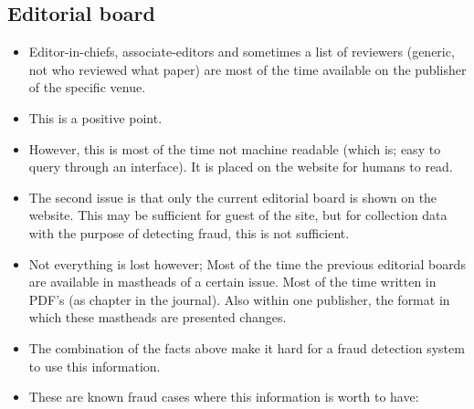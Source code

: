 \documentclass{ou-report}
\begin{document}
\subsection{Editorial board}
\begin{itemize}
    \item Editor-in-chiefs, associate-editors and sometimes a list of reviewers (generic, not who reviewed what paper) are most of the time available on the publisher of the specific venue. 
    \item This is a positive point.
    \item However, this is most of the time not machine readable (which is; easy to query through an interface). It is placed on the website for humans to read.
    \item The second issue is that only the current editorial board is shown on the website. This may be sufficient for guest of the site, but for collection data with the purpose of detecting fraud, this is not sufficient.
    \item Not everything is lost however; Most of the time the previous editorial boards are available in mastheads of a certain issue. Most of the time written in PDF's (as chapter in the journal). Also within one publisher, the format in which these mastheads are presented changes.
    \item The combination of the facts above make it hard for a fraud detection system to use this information.
    \item These are known fraud cases where this information is worth to have:
    
\end{itemize}
\end{document}
